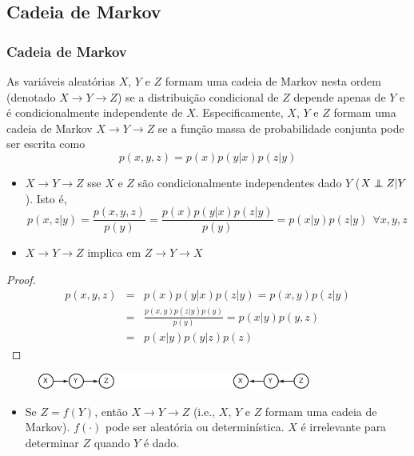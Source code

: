 \subsection{Cadeia de Markov}
\begin{frame}[allowframebreaks]
  \frametitle{Cadeia de Markov}
  \begin{definition}
  As variáveis aleatórias $X$, $Y$ e $Z$ formam uma cadeia de Markov nesta ordem
  (denotado $X \rightarrow Y \rightarrow Z$) se a distribuição condicional de $Z$
  depende apenas de $Y$ e é condicionalmente independente de $X$. Especificamente,
  $X$, $Y$ e $Z$ formam uma cadeia de Markov $X \rightarrow Y \rightarrow Z$ se
  a função massa de probabilidade conjunta pode ser escrita como
  \begin{equation}
  p(x,y,z) = p(x) p(y|x) p(z|y)
  \end{equation}
  \end{definition}

  \begin{itemize}
  \item $X \rightarrow Y \rightarrow Z$ sse $X$ e $Z$ são condicionalmente independentes
  dado $Y$ ($X \independent Z | Y$). Isto é,
  \begin{equation}
  p(x,z|y) = \frac{p(x,y,z)}{p(y)} = \frac{p(x)p(y|x)p(z|y)}{p(y)} = p(x|y) p(z|y) \ \ \forall x,y,z
  \end{equation}
  \end{itemize}

  \framebreak

  \begin{itemize}
  \item $X \rightarrow Y \rightarrow Z$ implica em $Z \rightarrow Y \rightarrow X$
  \end{itemize}
  \begin{proof}
  \begin{eqnarray}
        p(x,y,z) &=& p(x)p(y|x)p(z|y) = p(x,y)p(z|y) \nonumber \\
                &=& \frac{p(x,y)p(z|y)p(y)}{p(y)} = p(x|y) p(y,z) \nonumber \\
                &=& p(x|y) p(y|z) p(z)
  \end{eqnarray}
  \end{proof}

  \begin{figure}[h!]
  \centering
  \includegraphics[width=0.8\textwidth]{images/chainxyz.pdf}
  \label{fig:chain}
  \end{figure}

  \begin{itemize}
  \item Se $Z=f(Y)$, então $X \rightarrow Y \rightarrow Z$ (i.e., $X$, $Y$ e $Z$ formam
        uma cadeia de Markov). $f(\cdot)$ pode ser aleatória ou determinística. 
        $X$ é irrelevante para determinar $Z$ quando $Y$ é dado.
  \end{itemize}
\end{frame}

